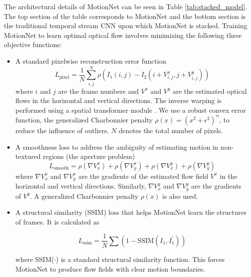 \documentclass[sigconf]{acmart}
\begin{document}
	The architectural details of MotionNet can be seen in Table \ref{tab:stacked_model}. The top section of the table corresponds to MotionNet and the bottom section is the traditional temporal stream CNN upon which MotionNet is stacked. Training MotionNet to learn optimal optical flow involves minimizing the following three objective functions:
	\begin{itemize}
		\item A standard pixelwise reconstruction error function
		\begin{equation}
			L_{\text{pixel}} = \frac{1}{N} \sum_{i, j}^{N} \rho ( I_{1}(i, j) - I_{2}(i+V_{i,j}^{x}, j+V_{i,j}^{y}) )
			\label{eq:pixel_loss}
		\end{equation}
		where $i$ and $j$ are the frame numbers and $V^x$ and $V^y$ are the estimated optical flows in the horizontal and vertical directions. The inverse warping is performed using a spatial transformer module \cite{stn_nips15}. We use a robust convex error function, the generalized Charbonnier penalty $\rho(x) = (x^{2} + \epsilon^{2})^{\alpha}$, to reduce the influence of outliers. 
		$N$ denotes the total number of pixels.
		
		\item A smoothness loss to address the ambiguity of estimating motion in non-textured regions (the aperture problem)
		\begin{equation}
			L_{\text{smooth}} = \rho (\nabla V_{x}^{x} ) + \rho ( \nabla V_{y}^{x}) + \rho ( \nabla V_{x}^{y}) + \rho ( \nabla V_{y}^{y})
			\label{eq:smoothness_loss}
		\end{equation}
		where $\nabla V_{x}^{x}$ and $\nabla V_{y}^{x}$ are the gradients of the estimated flow field $V^{x}$ in the horizontal and vertical directions. Similarly, $\nabla V_{x}^{y}$ and $\nabla V_{y}^{y}$ are the gradients of $V^{y}$. A generalized Charbonnier penalty $\rho(x)$ is also used.
		
		\item A structural similarity (SSIM) loss \cite{SSIM_2004} that helps MotionNet learn the structures of frames. It is calculated as
		
		\begin{equation}
			L_{\text{ssim}} = \frac{1}{N} \sum ( 1 - \text{SSIM} (I_{1}, I_{1}^{\prime}) )
			\label{eq:ssim_loss}
		\end{equation}
		
		where SSIM($\cdot$) is a standard structural similarity function. This forces MotionNet to produce flow fields with clear motion boundaries.
	\end{itemize}
	
\end{document}
